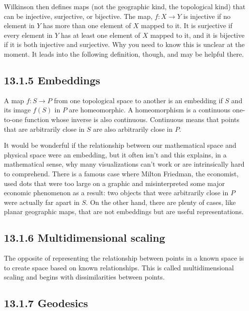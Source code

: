 Wilkinson then defines maps (not the geographic kind, the topological
kind) that can be injective, surjective, or bijective. The map,
\(f:X\rightarrow Y\) is injective if no element in \(Y\) has more than
one element of \(X\) mapped to it. It is surjective if every element in
\(Y\) has at least one element of \(X\) mapped to it, and it is
bijective if it is both injective and surjective. Why you need to know
this is unclear at the moment. It leads into the following definition,
though, and may be helpful there.

\hypertarget{embeddings}{%
\subsection{13.1.5 Embeddings}\label{embeddings}}

A map \(f:S\rightarrow P\) from one topological space to another is an
embedding if \(S\) and its image \(f(S)\) in \(P\) are homeomorphic. A
homeomorphism is a continuous one-to-one function whose inverse is also
continuous. Continuous means that points that are arbitrarily close in
\(S\) are also arbitrarily close in \(P\).

It would be wonderful if the relationship between our mathematical space
and physical space were an embedding, but it often isn't and this
explains, in a mathematical sense, why many visualizations can't work or
are intrinsically hard to comprehend. There is a famous case where
Milton Friedman, the economist, used dots that were too large on a
graphic and misinterpreted some major economic phenomenon as a result:
two objects that were arbitrarily close in \(P\) were actually far apart
in \(S\). On the other hand, there are plenty of cases, like planar
geographic maps, that are not embeddings but are useful representations.

\hypertarget{multidimensional-scaling}{%
\subsection{13.1.6 Multidimensional
scaling}\label{multidimensional-scaling}}

The opposite of representing the relationship between points in a known
space is to create space based on known relationships. This is called
multidimensional scaling and begins with dissimilarities between points.

\hypertarget{geodesics}{%
\subsection{13.1.7 Geodesics}\label{geodesics}}

